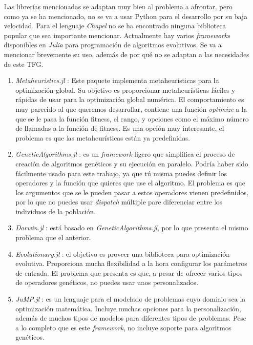 Las librerías mencionadas se adaptan muy bien al problema a afrontar, pero como ya se ha mencionado, no se va a usar Python para el desarrollo por su baja
velocidad. Para el lenguaje \emph{Chapel} no se ha encontrado ninguna biblioteca popular que sea importante mencionar. Actualmente hay varios
\emph{frameworks} disponibles en \emph{Julia} para programación de algoritmos evolutivos. Se va a mencionar brevemente su uso, además de por qué no
se adaptan a las necesidades de este TFG.

\begin{enumerate}
    \item \emph{Metaheuristics.jl} \cite{metaheuristics_jl}: Este paquete implementa metaheurísticas para la optimización global. Su objetivo es proporcionar metaheurísticas
    fáciles y rápidas de usar para la optimización global numérica. El comportamiento es muy parecido al que queremos desarrollar, contiene una función \emph{optimize}
    a la que se le pasa la función fitness, el rango, y opciones como el máximo número de llamadas a la función de fitness. Es una opción muy interesante, el problema es que las
    metaheurísticas están ya predefinidas.
    \item \emph{GeneticAlgorithms.jl} \cite{GeneticAlgorithms_jl}: es un \emph{framework} ligero que simplifica el proceso de creación de algoritmos genéticos y su ejecución en
    paralelo. Podría haber sido fácilmente usado para este trabajo, ya que tú misma puedes definir los operadores y la función que quieres que use el algoritmo. El problema es
    que los argumentos que se le pueden pasar a estos operadores vienen predefinidos, por lo que no puedes usar \emph{dispatch} múltiple pare diferenciar entre los individuos de 
    la población.
    \item \emph{Darwin.jl} \cite{darwin_jl}: está basado en \emph{GeneticAlgorithms.jl}, por lo que presenta el mismo problema que el anterior.
    \item \emph{Evolutionary.jl} \cite{evolutionary_jl}: el objetivo es proveer una biblioteca para optimización evolutiva. Proporciona mucha flexibilidad a la hora configurar los parámetros
    de entrada. El problema que presenta es que, a pesar de ofrecer varios tipos de operadores genéticos, no puedes usar unos personalizados.
    \item \emph{JuMP.jl} \cite{DunningHuchetteLubin2017}: es un lenguaje para el modelado de problemas cuyo dominio sea la optimización matemática. Incluye muchas opciones para la personalización,
    además de muchos tipos de modelos para diferentes tipos de problemas. Pese a lo completo que es este \emph{framework}, no incluye soporte para algoritmos genéticos.
\end{enumerate}

